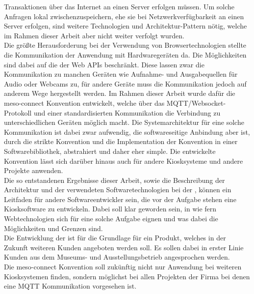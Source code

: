 Transaktionen über das Internet an einen Server erfolgen müssen. Um solche Anfragen lokal zwischenzuspeichern,
ehe sie bei Netzwerkverfügbarkeit an einen Server erfolgen, sind weitere Technologien und 
Architektur-Pattern nötig, welche im Rahmen dieser Arbeit aber nicht weiter verfolgt wurden.\\
Die größte Herausforderung bei der Verwendung von Browsertechnologien stellte die Kommunikation 
der Anwendung mit Hardwaregeräten da. 
Die Möglichkeiten sind dabei auf die der Web APIs beschränkt. Diese lassen zwar die Kommunikation zu manchen
Geräten wie Aufnahme- und Ausgabequellen für Audio oder Webcams zu, für andere Geräte muss die Kommunikation
jedoch auf anderem Wege hergestellt werden. Im Rahmen dieser Arbeit wurde dafür die meso-connect Konvention 
entwickelt, welche über das MQTT/Websocket-Protokoll und einer standardisierten Kommunikation die Verbindung
zu unterschiedlichen Geräten möglich macht. Die Systemarchitektur für eine solche Kommunikation ist dabei zwar
aufwendig, die softwareseitige Anbindung aber ist, durch die strikte Konvention und die Implementation der Konvention
in einer Softwarebibliothek, abstrahiert und daher eher simple. Die entwickelte Konvention lässt sich darüber 
hinaus auch für andere Kiosksysteme und andere Projekte anwenden.\\

Die so entstandenen Ergebnisse dieser Arbeit, sowie die Beschreibung der Architektur und der verwendeten
Softwaretechnologien bei der \shst{}, können ein Leitfaden für andere Softwareentwickler sein, die 
vor der Aufgabe stehen eine Kiosksoftware zu entwickeln. Dabei soll klar geworden sein, in wie fern 
Webtechnologien sich für eine solche Aufgabe eignen und was dabei die Möglichkeiten und Grenzen sind.\\
Die Entwicklung der \shst{} ist für \meso{} die Grundlage für ein Produkt, 
welches in der Zukunft weiteren Kunden angeboten werden soll. Es sollen dabei in erster Linie Kunden 
aus dem Museums- und Ausstellungsbetrieb angesprochen werden.\\
Die meso-connect Konvention soll zukünftig nicht nur Anwendung bei weiteren Kiosksystemen finden, sondern 
möglichst bei allen Projekten der Firma \meso{} bei denen eine MQTT Kommunikation vorgesehen ist. 


